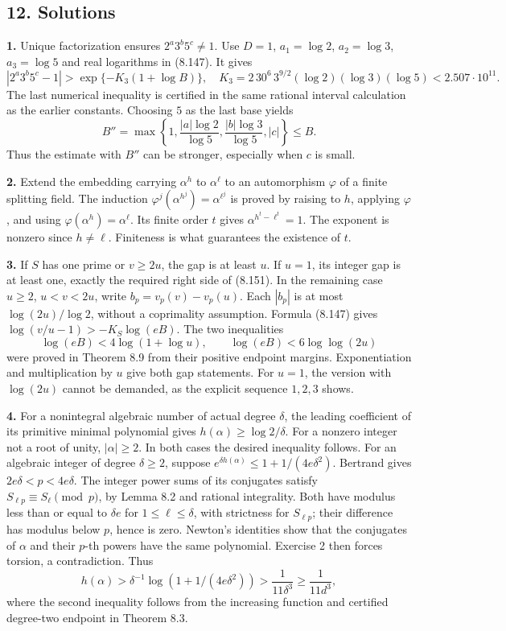 \documentclass[
  11pt,
  a4paper,
]{article}
\begin{document}
\subsection{12. Solutions}\label{solutions}

\textbf{1.} Unique factorization ensures \(2^a3^b5^c\ne1\). Use \(D=1\),
\(a_1=\log2\), \(a_2=\log3\), \(a_3=\log5\) and real logarithms in
(8.147). It gives \[
|2^a3^b5^c-1|>
\exp\{-K_3(1+\log B)\},
\quad
K_3=2\,30^6\,3^{9/2}(\log2)(\log3)(\log5)
<2.507\cdot10^{11}.
\] The last numerical inequality is certified in the same rational
interval calculation as the earlier constants. Choosing \(5\) as the
last base yields \[
B''=\max\left\{1,\frac{|a|\log2}{\log5},
\frac{|b|\log3}{\log5},|c|\right\}\le B.
\] Thus the estimate with \(B''\) can be stronger, especially when \(c\)
is small.

\textbf{2.} Extend the embedding carrying \(\alpha^h\) to
\(\alpha^\ell\) to an automorphism \(\varphi\) of a finite splitting
field. The induction \(\varphi^j(\alpha^{h^j})=\alpha^{\ell^j}\) is
proved by raising to \(h\), applying \(\varphi\), and using
\(\varphi(\alpha^h)=\alpha^\ell\). Its finite order \(t\) gives
\(\alpha^{h^t-\ell^t}=1\). The exponent is nonzero since \(h\ne\ell\).
Finiteness is what guarantees the existence of \(t\).

\textbf{3.} If \(S\) has one prime or \(v\ge2u\), the gap is at least
\(u\). If \(u=1\), its integer gap is at least one, exactly the required
right side of (8.151). In the remaining case \(u\ge2\), \(u<v<2u\),
write \(b_p=v_p(v)-v_p(u)\). Each \(|b_p|\) is at most
\(\log(2u)/\log2\), without a coprimality assumption. Formula (8.147)
gives \(\log(v/u-1)>-K_S\log(eB)\). The two inequalities \[
\log(eB)<4\log(1+\log u),\qquad
\log(eB)<6\log\log(2u)
\] were proved in Theorem 8.9 from their positive endpoint margins.
Exponentiation and multiplication by \(u\) give both gap statements. For
\(u=1\), the version with \(\log(2u)\) cannot be demanded, as the
explicit sequence \(1,2,3\) shows.

\textbf{4.} For a nonintegral algebraic number of actual degree
\(\delta\), the leading coefficient of its primitive minimal polynomial
gives \(h(\alpha)\ge\log2/\delta\). For a nonzero integer not a root of
unity, \(|\alpha|\ge2\). In both cases the desired inequality follows.
For an algebraic integer of degree \(\delta\ge2\), suppose
\(e^{\delta h(\alpha)}\le1+1/(4e\delta^2)\). Bertrand gives
\(2e\delta<p<4e\delta\). The integer power sums of its conjugates
satisfy \(S_{\ell p}\equiv S_\ell\pmod p\), by Lemma 8.2 and rational
integrality. Both have modulus less than or equal to \(\delta e\) for
\(1\le\ell\le\delta\), with strictness for \(S_{\ell p}\); their
difference has modulus below \(p\), hence is zero. Newton's identities
show that the conjugates of \(\alpha\) and their \(p\)-th powers have
the same polynomial. Exercise 2 then forces torsion, a contradiction.
Thus \[
h(\alpha)>\delta^{-1}\log(1+1/(4e\delta^2))
>\frac1{11\delta^3}\ge\frac1{11d^3},
\] where the second inequality follows from the increasing function and
certified degree-two endpoint in Theorem 8.3.
\end{document}
